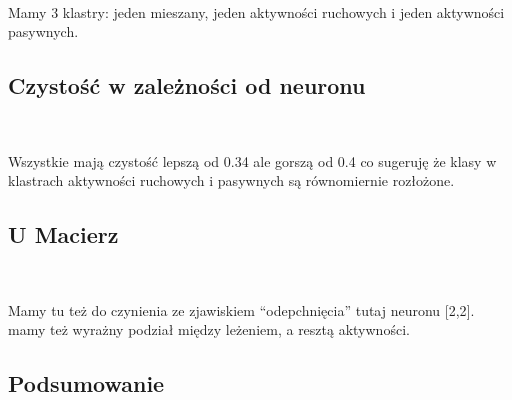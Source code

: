 \documentclass[11pt]{article}
\begin{document}
            
        
    \begin{center}
    \end{center}
    { \hspace*{\fill} \\}
    
    Mamy 3 klastry: jeden mieszany, jeden aktywności ruchowych i jeden
aktywności pasywnych.

    \hypertarget{czystoux15bux107-w-zaleux17cnoux15bci-od-neuronu}{%
\subsection{Czystość w zależności od
neuronu}\label{czystoux15bux107-w-zaleux17cnoux15bci-od-neuronu}}

           
        
  

    
    \begin{center}
    \end{center}
    { \hspace*{\fill} \\}
    
    Wszystkie mają czystość lepszą od 0.34 ale gorszą od 0.4 co sugeruję że
klasy w klastrach aktywności ruchowych i pasywnych są równomiernie
rozłożone.

    \hypertarget{u-macierz}{%
\subsection{U Macierz}\label{u-macierz}}

    \begin{center}
    \end{center}
    { \hspace*{\fill} \\}
    
    Mamy tu też do czynienia ze zjawiskiem ``odepchnięcia'' tutaj neuronu
{[}2,2{]}. mamy też wyrażny podział między leżeniem, a resztą
aktywności.

    \hypertarget{podsumowanie}{%
\subsection{Podsumowanie}\label{podsumowanie}}
\end{document}
